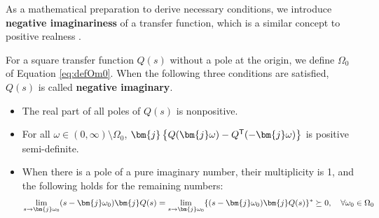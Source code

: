 \documentclass[tombow,dvipdfmx]{corona-a5-1.1}
\begin{document}
As a mathematical preparation to derive necessary conditions, we introduce \textbf{negative imaginariness} of a transfer function, which is a similar concept to positive realness \cite{petersen2010feedback,xiong2010negative}.

\begin{定義}
\label{def:trni}
For a square transfer function $Q(s)$ without a pole at the origin, we define $\Omega_0$ of Equation \ref{eq:defOm0}.
When the following three conditions are satisfied, $Q(s)$ is called \textbf{negative imaginary}.
\begin{itemize}
\item The real part of all poles of $Q(s)$ is nonpositive.
\item For all $\omega \in (0,\infty)\setminus \Omega_0$, $\bm{j}\left\{Q(\bm{j} \omega) - Q^{\sf T}(-\bm{j} \omega) \right\}$ is positive semi-definite.
\item When there is a pole of a pure imaginary number, their multiplicity is 1, and the following holds for the remaining numbers:
\begin{align*}
\lim_{s \rightarrow \bm{j} \omega_0} (s-\bm{j} \omega_0) \bm{j} Q(s) = 
\lim_{s\rightarrow \bm{j} \omega_0} \{ (s-\bm{j} \omega_0) \bm{j} Q(s)\}^{\sf *}\succeq 0
,\quad
\forall \omega_0 \in \Omega_0
\end{align*}
\end{itemize}
\end{定義}
\end{document}
